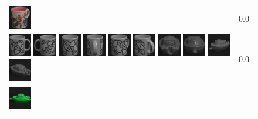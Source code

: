 {\begin{figure}[p]
\begin{tabular}{m{11cm} | m{3cm} |}
\includegraphics[width=1cm]{coil/beeld-9.eps}
& {\scriptsize 0.0}
\\
\includegraphics[width=1cm]{coil/beeld-48.eps}
\includegraphics[width=1cm]{coil/beeld-49.eps}
\includegraphics[width=1cm]{coil/beeld-50.eps}
\includegraphics[width=1cm]{coil/beeld-53.eps}
\includegraphics[width=1cm]{coil/beeld-51.eps}
\includegraphics[width=1cm]{coil/beeld-52.eps}
\includegraphics[width=1cm]{coil/beeld-29.eps}
\includegraphics[width=1cm]{coil/beeld-26.eps}
\includegraphics[width=1cm]{coil/beeld-27.eps}
\includegraphics[width=1cm]{coil/beeld-28.eps}
& {\scriptsize 0.0}
\\
\includegraphics[width=1cm]{coil/beeld-54.eps}

\end{tabular}
\end{figure}}
